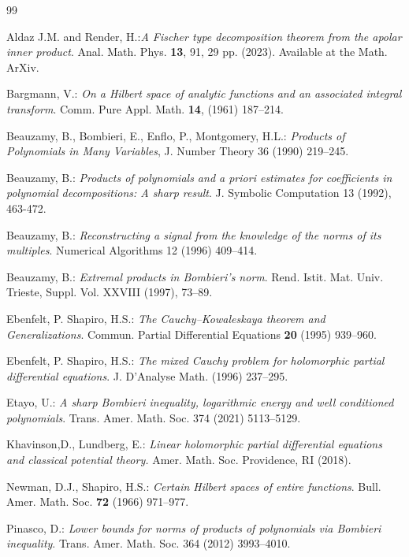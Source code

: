 \documentclass[12pt]{amsart}
\begin{document}
 \begin{thebibliography}{99}  

 Aldaz J.M. and  Render, H.:{\em A Fischer type decomposition theorem from the apolar inner product}.  Anal. Math. Phys. \textbf{13}, 91, 29 pp. (2023). Available at the Math. ArXiv.
 

	  Bargmann, V.:  {\em On a Hilbert space of analytic functions and an associated integral transform}.  Comm. Pure Appl. Math. \textbf{14},  (1961)  187--214. 

  Beauzamy, B.,  Bombieri, E.,  Enflo, P.,  Montgomery, H.L.: {\em Products
of Polynomials in Many Variables}, J. Number Theory 36 (1990) 219--245.

 Beauzamy, B.: {\em Products of polynomials and a priori estimates
for coefficients in polynomial decompositions: A sharp result}. J. Symbolic
Computation 13 (1992), 463-472.

 Beauzamy, B.: {\em Reconstructing a signal from the knowledge of
the norms of its multiples}. Numerical Algorithms 12 (1996) 409--414.

 Beauzamy, B.: {\em Extremal products in Bombieri's norm}. Rend.
Istit. Mat. Univ. Trieste, Suppl. Vol. XXVIII (1997), 73--89. 

 Ebenfelt, P.  Shapiro, H.S.:  {\em  The Cauchy--Kowaleskaya
		theorem and Generalizations}.  Commun. Partial Differential Equations \textbf{20} (1995) 
	 939--960. 
	
	 Ebenfelt, P.  Shapiro, H.S.:   {\em  The mixed Cauchy problem
		for holomorphic partial differential equations}. J. D'Analyse Math.  
(1996)	237--295.  
	

  Etayo, U.: {\em  A sharp Bombieri inequality, logarithmic energy
and well conditioned polynomials}. Trans. Amer. Math. Soc. 374 (2021)
5113--5129. 

	 Khavinson,D., Lundberg, E.: \emph{Linear holomorphic partial
differential equations and classical potential theory.} Amer. Math. Soc.
Providence, RI (2018).



 Newman, D.J.,  Shapiro,  H.S.:  {\em Certain Hilbert spaces of
		entire functions}.  Bull. Amer. Math. Soc.  \textbf{ 72}  (1966)  971--977.


 Pinasco, D.: {\em Lower bounds for norms of products of polynomials
via Bombieri inequality}. Trans. Amer. Math. Soc. 364 (2012) 3993--4010.



\end{thebibliography}
\end{document}
